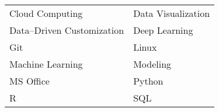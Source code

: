 \begin{center}
    \begin{tabular}{ m{5cm} m{5cm} }
        Cloud Computing            & Data Visualization \\
        Data--Driven Customization & Deep Learning      \\
        Git                        & Linux              \\
        Machine Learning           & Modeling           \\
        MS Office                  & Python             \\
        R                          & SQL
    \end{tabular}
\end{center}